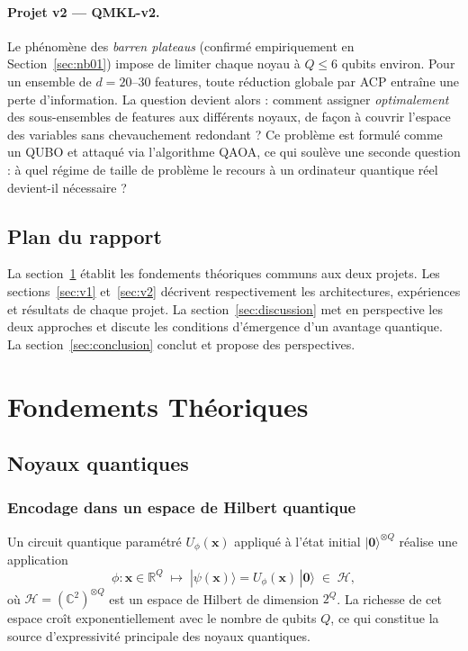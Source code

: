 \documentclass[12pt,a4paper]{article}
\begin{document}
\paragraph{Projet v2 — QMKL-v2.}
Le phénomène des \emph{barren plateaus} (confirmé empiriquement en
Section~\ref{sec:nb01}) impose de limiter chaque noyau à $Q \leq 6$ qubits environ.
Pour un ensemble de $d = 20$--30 features, toute réduction globale par ACP
entraîne une perte d'information.
La question devient alors : comment assigner \emph{optimalement} des
sous-ensembles de features aux différents noyaux, de façon à couvrir l'espace
des variables sans chevauchement redondant ?
Ce problème est formulé comme un QUBO et attaqué via l'algorithme QAOA,
ce qui soulève une seconde question : à quel régime de taille de problème
le recours à un ordinateur quantique réel devient-il nécessaire ?

\subsection{Plan du rapport}

La section~\ref{sec:theory} établit les fondements théoriques communs aux deux
projets.
Les sections~\ref{sec:v1} et~\ref{sec:v2} décrivent respectivement les
architectures, expériences et résultats de chaque projet.
La section~\ref{sec:discussion} met en perspective les deux approches et
discute les conditions d'émergence d'un avantage quantique.
La section~\ref{sec:conclusion} conclut et propose des perspectives.

\section{Fondements Théoriques}
\label{sec:theory}

\subsection{Noyaux quantiques}

\subsubsection{Encodage dans un espace de Hilbert quantique}

Un circuit quantique paramétré $U_\phi(\bm{x})$ appliqué à l'état initial
$|\bm{0}\rangle^{\otimes Q}$ réalise une application
\begin{equation}
  \phi : \bm{x} \in \mathbb{R}^Q \;\longmapsto\; |\psi(\bm{x})\rangle
  = U_\phi(\bm{x})\,|\bm{0}\rangle \;\in\; \mathcal{H},
\end{equation}
où $\mathcal{H} = (\mathbb{C}^2)^{\otimes Q}$ est un espace de Hilbert de
dimension $2^Q$.
La richesse de cet espace croît exponentiellement avec le nombre de qubits $Q$,
ce qui constitue la source d'expressivité principale des noyaux quantiques.
\end{document}
